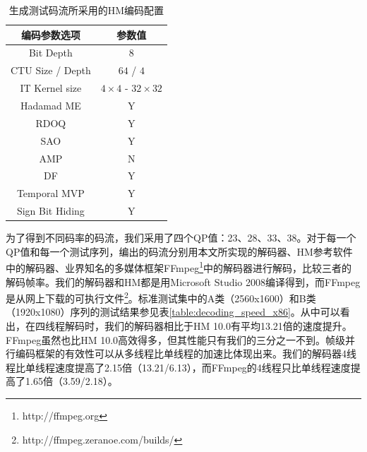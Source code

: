 \begin{table}[h]
	\begin{center}
		\caption{生成测试码流所采用的HM编码配置} \label{table:HM_config}
		\renewcommand{\arraystretch}{1.5}
		\begin{tabular}{c|c}
			\hline
			\textbf{编码参数选项} & \textbf{参数值} \\
			\hline
			\hline
			Bit Depth & $8$ \\
			\hline
			CTU Size / Depth & $64$ / $4$ \\
			\hline
			IT Kernel size & $4 \times 4$ - $32 \times 32$ \\
			\hline
			Hadamad ME & Y \\
			\hline
			RDOQ & Y \\
			\hline
			SAO & Y \\
			\hline
			AMP & N \\
			\hline
			DF & Y \\
			\hline
			Temporal MVP & Y \\
			\hline
			Sign Bit Hiding & Y \\
			\hline
		\end{tabular}
	\end{center}
\end{table}

为了得到不同码率的码流，我们采用了四个QP值：23、28、33、38。对于每一个QP值和每一个测试序列，编出的码流分别用本文所实现的解码器、HM参考软件中的解码器、业界知名的多媒体框架FFmpeg\footnote{http://ffmpeg.org}中的解码器进行解码，比较三者的解码帧率。我们的解码器和HM都是用Microsoft Studio 2008编译得到，而FFmpeg是从网上下载的可执行文件\footnote{http://ffmpeg.zeranoe.com/builds/}。标准测试集中的A类（2560x1600）和B类（1920x1080）序列的测试结果参见表\ref{table:decoding_speed_x86}。从中可以看出，在四线程解码时，我们的解码器相比于HM 10.0有平均13.21倍的速度提升。FFmpeg虽然也比HM 10.0高效得多，但其性能只有我们的三分之一不到。帧级并行编码框架的有效性可以从多线程比单线程的加速比体现出来。我们的解码器4线程比单线程速度提高了2.15倍（13.21/6.13），而FFmpeg的4线程只比单线程速度提高了1.65倍（3.59/2.18）。

